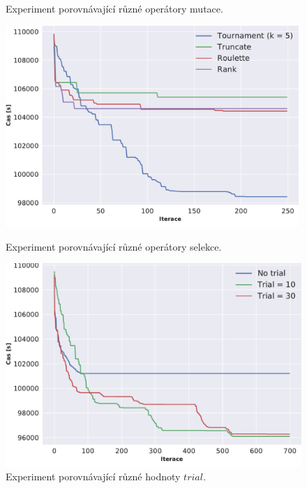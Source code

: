 \begin{figure}[t]
\begin{minipage}{0.49\textwidth}
        \caption{Experiment porovnávající různé operátory mutace.}
        \label{fig:compMutation}
    \end{minipage}\hfill
\end{figure}
\begin{figure}[t]
    \begin{minipage}{0.49\textwidth}
        \centering
        \includegraphics[width=0.99\textwidth]{figures/vyhodnoceni/plotComparisonSelections.pdf}
        \caption{Experiment porovnávající různé operátory selekce.}
        \label{fig:compSelection}
    \end{minipage}\hfill
    \begin{minipage}{0.49\textwidth}
        \centering
        \includegraphics[width=1\textwidth]{figures/vyhodnoceni/plotComparisonTrials.pdf}
        \caption{Experiment porovnávající různé hodnoty $trial$.}
        \label{fig:compTrial}
    \end{minipage}\hfill
\end{figure}
